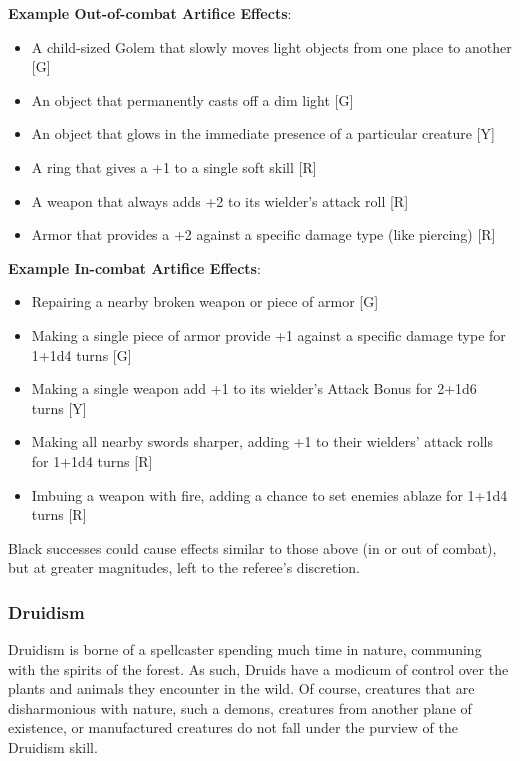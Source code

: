 \documentclass[oneside]{book}
\begin{document}
\begin{multicols}{2}
\textbf{Example Out-of-combat Artifice Effects}: 
	\begin{itemize}
		\setlength{\itemsep}{0cm}%
  		\setlength{\parskip}{0cm}%
		\item{ \small A child-sized Golem that slowly moves light objects from one place to another [G]}
		\item{ \small An object that permanently casts off a dim light [G]}
		\item{ \small An object that glows in the immediate presence of a particular creature [Y]}
		\item{ \small A ring that gives a +1 to a single soft skill [R]}
		\item{ \small A weapon that always adds +2 to its wielder's attack roll [R]}
		\item{ \small Armor that provides a +2 against a specific damage type (like piercing) [R]}
	\end{itemize}

\textbf{Example In-combat Artifice Effects}: 
	\begin{itemize}
		\setlength{\itemsep}{0cm}%
  		\setlength{\parskip}{0cm}%
  		\item{ \small Repairing a nearby broken weapon or piece of armor [G]}
  		\item{ \small Making a single piece of armor provide +1 against a specific damage type for 1+1d4 turns [G]}
  		\item{ \small Making a single weapon add +1 to its wielder's Attack Bonus for 2+1d6 turns [Y]}
  		\item{ \small Making all nearby swords sharper, adding +1 to their wielders' attack rolls for 1+1d4 turns [R]}
  		\item{ \small Imbuing a weapon with fire, adding a chance to set enemies ablaze for 1+1d4 turns [R]}
	\end{itemize}
Black successes could cause effects similar to those above (in or out of combat), but at greater magnitudes, left to the referee's discretion.

\subsubsection{Druidism}
Druidism is borne of a spellcaster spending much time in nature, communing with the spirits of the forest. As such, Druids have a modicum of control over the plants and animals they encounter in the wild. Of course, creatures that are disharmonious with nature, such a demons, creatures from another plane of existence, or manufactured creatures do not fall under the purview of the Druidism skill.


\end{multicols}
\end{document}
